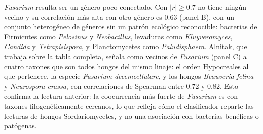 \begin{table}[H]
\centering
\caption{Métricas de la red de coocurrencia SparCC entre géneros según el umbral de correlación.
``Neg.'' es el número de aristas con correlación negativa, ``Gigante'' el tamaño del componente
gigante, ``Agrup.'' el coeficiente de agrupamiento y la modularidad se calcula con el método de
Louvain; el grado de \textit{Fusarium} es su número de vecinos. \href{https://github.com/CamilaSilva1995/Tesis_Maestria/blob/main/Analisis_Comparativo/Fresa_Solena/20261002_RegenerarRedesCoocurrencia33.R}{(Script: \texttt{20261002\_RegenerarRedesCoocurrencia33.R})}}
\label{tab:redes-metricas}
\setlength{\tabcolsep}{4pt}
\end{table}

\textit{Fusarium} resulta ser un género poco conectado. Con $|r| \geq 0.7$ no tiene ningún vecino y
su correlación más alta con otro género es 0.63 (panel B), con un conjunto heterogéneo de géneros
sin un patrón ecológico reconocible: bacterias de Firmicutes como \textit{Pelosinus} y
\textit{Neobacillus}, levaduras como \textit{Kluyveromyces}, \textit{Candida} y \textit{Tetrapisispora},
y Planctomycetes como \textit{Paludisphaera}. Alnitak, que trabaja sobre la tabla completa, señala
como vecinos de \textit{Fusarium} (panel C) a cuatro taxones que son todos hongos del mismo linaje:
el orden Hypocreales al que pertenece, la especie \textit{Fusarium decemcellulare}, y los hongos
\textit{Beauveria felina} y \textit{Neurospora crassa}, con correlaciones de Spearman entre 0.72 y 0.82.
Esto confirma la lectura anterior: la coocurrencia más fuerte de \textit{Fusarium} es con taxones
filogenéticamente cercanos, lo que refleja cómo el clasificador reparte las lecturas de hongos
Sordariomycetes, y no una asociación con bacterias benéficas o patógenas.

